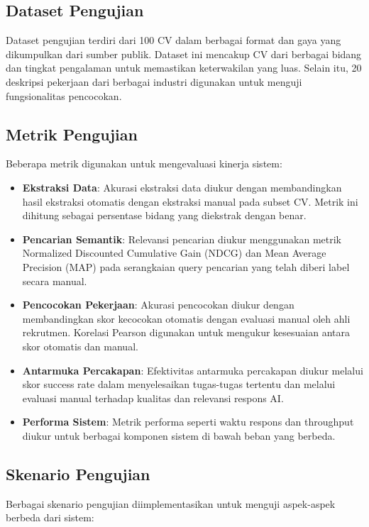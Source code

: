 \subsection{Dataset Pengujian}
Dataset pengujian terdiri dari 100 CV dalam berbagai format dan gaya yang dikumpulkan dari sumber publik. Dataset ini mencakup CV dari berbagai bidang dan tingkat pengalaman untuk memastikan keterwakilan yang luas. Selain itu, 20 deskripsi pekerjaan dari berbagai industri digunakan untuk menguji fungsionalitas pencocokan.

\subsection{Metrik Pengujian}
Beberapa metrik digunakan untuk mengevaluasi kinerja sistem:

\begin{itemize}
    \item \textbf{Ekstraksi Data}: Akurasi ekstraksi data diukur dengan membandingkan hasil ekstraksi otomatis dengan ekstraksi manual pada subset CV. Metrik ini dihitung sebagai persentase bidang yang diekstrak dengan benar.
    
    \item \textbf{Pencarian Semantik}: Relevansi pencarian diukur menggunakan metrik Normalized Discounted Cumulative Gain (NDCG) dan Mean Average Precision (MAP) pada serangkaian query pencarian yang telah diberi label secara manual.
    
    \item \textbf{Pencocokan Pekerjaan}: Akurasi pencocokan diukur dengan membandingkan skor kecocokan otomatis dengan evaluasi manual oleh ahli rekrutmen. Korelasi Pearson digunakan untuk mengukur kesesuaian antara skor otomatis dan manual.
    
    \item \textbf{Antarmuka Percakapan}: Efektivitas antarmuka percakapan diukur melalui skor success rate dalam menyelesaikan tugas-tugas tertentu dan melalui evaluasi manual terhadap kualitas dan relevansi respons AI.
    
    \item \textbf{Performa Sistem}: Metrik performa seperti waktu respons dan throughput diukur untuk berbagai komponen sistem di bawah beban yang berbeda.
\end{itemize}

\subsection{Skenario Pengujian}
Berbagai skenario pengujian diimplementasikan untuk menguji aspek-aspek berbeda dari sistem:


